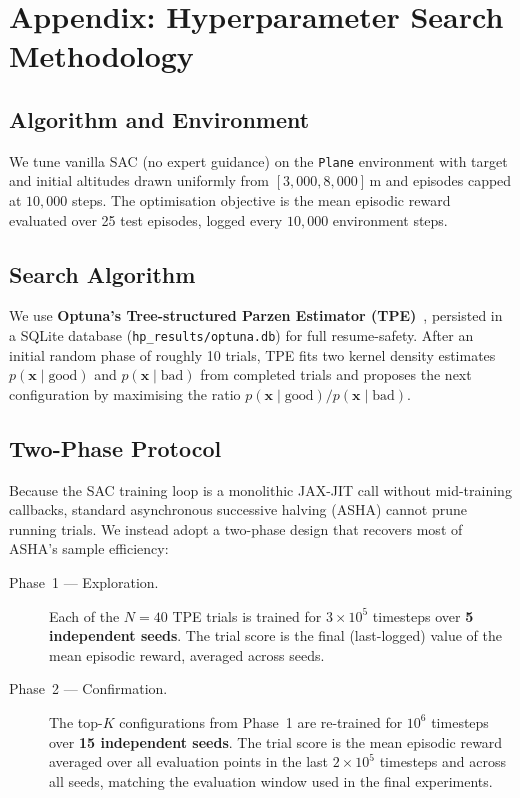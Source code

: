 \section*{Appendix: Hyperparameter Search Methodology}
\label{app:hyperparam}

\subsection*{Algorithm and Environment}

We tune vanilla SAC (no expert guidance) on the \texttt{Plane} environment with
target and initial altitudes drawn uniformly from $[3{,}000, 8{,}000]$\,m and
episodes capped at $10{,}000$ steps.
The optimisation objective is the mean episodic reward evaluated over 25 test
episodes, logged every $10{,}000$ environment steps.

\subsection*{Search Algorithm}

We use \textbf{Optuna's Tree-structured Parzen Estimator (TPE)}~\cite{bergstra2011tpe},
persisted in a SQLite database (\texttt{hp\_results/optuna.db}) for full
resume-safety.
After an initial random phase of roughly 10 trials, TPE fits two kernel density
estimates $p(\mathbf{x} \mid \text{good})$ and $p(\mathbf{x} \mid \text{bad})$
from completed trials and proposes the next configuration by maximising the ratio
$p(\mathbf{x} \mid \text{good}) / p(\mathbf{x} \mid \text{bad})$.

\subsection*{Two-Phase Protocol}

Because the SAC training loop is a monolithic JAX-JIT call without mid-training
callbacks, standard asynchronous successive halving (ASHA) cannot prune running
trials.
We instead adopt a two-phase design that recovers most of ASHA's sample
efficiency:

\begin{description}
  \item[Phase~1 — Exploration.]
    Each of the $N = 40$ TPE trials is trained for
    $3 \times 10^{5}$ timesteps over \textbf{5 independent seeds}.
    The trial score is the final (last-logged) value of the mean episodic reward,
    averaged across seeds.

  \item[Phase~2 — Confirmation.]
    The top-$K$ configurations from Phase~1 are re-trained for
    $10^{6}$ timesteps over \textbf{15 independent seeds}.
    The trial score is the mean episodic reward averaged over all evaluation
    points in the last $2 \times 10^{5}$ timesteps and across all seeds,
    matching the evaluation window used in the final experiments.
\end{description}

